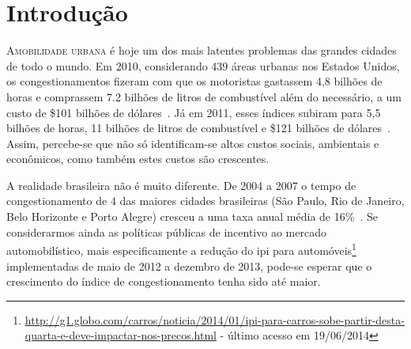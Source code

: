 
\newpage
\chapter{Introdução}
\label{chp: Introdução}

\lettrine{A}{mobilidade urbana} é hoje um dos mais latentes problemas das grandes cidades de todo o mundo. Em 2010, considerando 439 áreas urbanas nos Estados Unidos, os congestionamentos fizeram com que os motoristas gastassem 4,8 bilhões de horas e comprassem 7.2 bilhões de litros de combustível além do necessário, a um custo de \$101 bilhões de dólares~\cite{Eisele2011}. Já em 2011, esses índices subiram para 5,5 bilhões de horas, 11 bilhões de litros de combustível e \$121 bilhões de dólares~\cite{Schrank2012}. Assim, percebe-se que não só identificam-se altos custos sociais, ambientais e econômicos, como também estes custos são crescentes.

A realidade brasileira não é muito diferente. De 2004 a 2007 o tempo de congestionamento de 4 das maiores cidades brasileiras (São Paulo, Rio de Janeiro, Belo Horizonte e Porto Alegre) cresceu a uma taxa anual média de 16\%~\cite{SOUSAPRRESENDE2009}. Se considerarmos ainda as políticas públicas de incentivo ao mercado automobilístico, mais especificamente a redução do \gls{ipi} para automóveis\footnote{\sloppy\url{http://g1.globo.com/carros/noticia/2014/01/ipi-para-carros-sobe-partir-desta-quarta-e-deve-impactar-nos-precos.html} - último acesso em 19/06/2014} implementadas de maio de 2012 a dezembro de 2013, pode-se esperar que o crescimento do índice de congestionamento tenha sido até maior.

